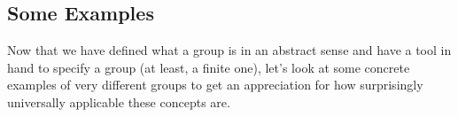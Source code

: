 






\subsection{Some Examples}
Now that we have defined what a group is in an abstract sense and have a tool in hand to specify a group (at least, a finite one), let's look at some concrete examples of very different groups to get an appreciation for how surprisingly universally applicable these concepts are.

